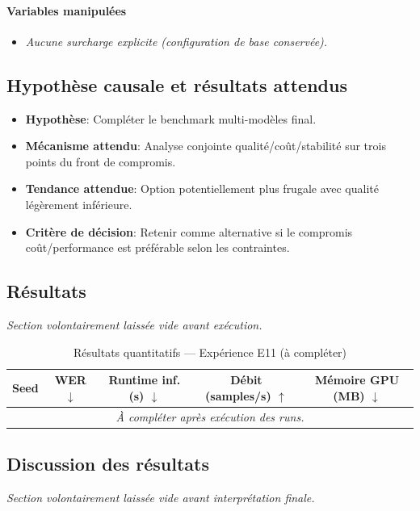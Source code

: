 \documentclass[11pt,a4paper]{article}
\begin{document}
\paragraph{Variables manipulées}
\begin{itemize}
\item \textit{Aucune surcharge explicite (configuration de base conservée).}
\end{itemize}

\subsection{Hypothèse causale et résultats attendus}
\begin{itemize}[leftmargin=1.2cm]
\item \textbf{Hypothèse}: Compléter le benchmark multi-modèles final.
\item \textbf{Mécanisme attendu}: Analyse conjointe qualité/coût/stabilité sur trois points du front de compromis.
\item \textbf{Tendance attendue}: Option potentiellement plus frugale avec qualité légèrement inférieure.
\item \textbf{Critère de décision}: Retenir comme alternative si le compromis coût/performance est préférable selon les contraintes.
\end{itemize}

\subsection{Résultats}
\textit{Section volontairement laissée vide avant exécution.}

\begin{table}[H]
\centering
\caption{Résultats quantitatifs --- Expérience E11 (à compléter)}
\begin{tabular}{lcccc}
\toprule
Seed & WER $\downarrow$ & Runtime inf. (s) $\downarrow$ & Débit (samples/s) $\uparrow$ & Mémoire GPU (MB) $\downarrow$ \\
\midrule
\multicolumn{5}{c}{\textit{À compléter après exécution des runs.}} \\
\bottomrule
\end{tabular}
\end{table}

\subsection{Discussion des résultats}
\textit{Section volontairement laissée vide avant interprétation finale.}
\end{document}
